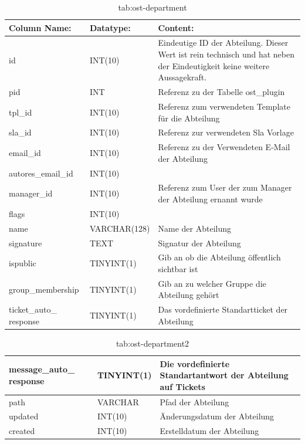 \begin{table}[h]
	\begin{tabular}{|p{3.5cm}|p{4cm}|p{6.2cm}|}
		\hline
		\textbf{Column Name:} & \textbf{Datatype:} & \textbf{Content:}\\
		\hline
		id & INT(10) & Eindeutige ID der Abteilung. Dieser Wert ist rein technisch und hat  neben der Eindeutigkeit keine weitere 
		Aussagekraft.\\
		\hline
		pid & INT & Referenz zu der Tabelle ost\_plugin \\
		\hline
		tpl\_id & INT(10) & Referenz zum verwendeten Template für die Abteilung\\
		\hline
		sla\_id & INT(10) & Referenz zur verwendeten Sla Vorlage\\
		\hline
		email\_id & INT(10) & Referenz zu der Verwendeten E-Mail der Abteilung\\
		\hline
		autores\_email\_id & INT(10) & \\
		\hline
		manager\_id & INT(10) & Referenz zum User der zum Manager der Abteilung ernannt wurde\\
		\hline
		flags & INT(10) & \\
		\hline
		name & VARCHAR(128) & Name der Abteilung \\
		\hline
		signature & TEXT & Signatur der Abteilung \\
		\hline
		ispublic & TINYINT(1) & Gib an ob die Abteilung öffentlich sichtbar ist \\
		\hline
		group\_membership & TINYINT(1) & Gib an zu welcher Gruppe die Abteilung gehört \\
		\hline
		ticket\_auto\_ response & TINYINT(1) & Das vordefinierte Standartticket der Abteilung \\
		\hline
	\end{tabular}
	\caption{tab:ost-department}
\end{table}
\label{tab:ost_department}
\newpage
\begin{table}[h]
	\begin{tabular}{|p{3.5cm}|p{4cm}|p{6.2cm}|}
		\hline
		message\_auto\_ response & TINYINT(1) & Die vordefinierte Standartantwort der Abteilung auf Tickets \\
		\hline
		path & VARCHAR & Pfad der Abteilung\\
		\hline
		updated & INT(10) & Änderungsdatum der Abteilung\\
		\hline
		created & INT(10) & Erstelldatum der Abteilung\\
		\hline
	\end{tabular}
	\caption{tab:ost-department2}
\end{table}
\label{tab:ost_department2}

